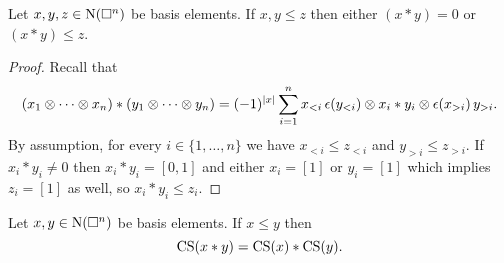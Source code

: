 \begin{lemma}
	Let $x, y, z \in \operatorname{N}(\square^n)$ be basis elements.
	If $x, y \leq z$ then either $(x \ast y) = 0$ or $(x \ast y) \leq z$.
\end{lemma}

\begin{proof}
	Recall that
	\begin{align*}
		(x_1 \otimes \cdots \otimes x_n) \ast (y_1 \otimes \cdots \otimes y_n) =
		(-1)^{|x|} \sum_{i=1}^n x_{<i}\, \epsilon(y_{<i}) \otimes x_i \ast y_i \otimes \epsilon(x_{>i}) \, y_{>i}.
	\end{align*}
	By assumption, for every $i \in \{1, \dots, n\}$ we have $x_{<i} \leq z_{<i}$ and $y_{>i} \leq z_{>i}$.
	If $x_i \ast y_i \neq 0$ then $x_i \ast y_i = [0,1]$ and either $x_i = [1]$ or $y_i = [1]$ which implies $z_i = [1]$ as well, so $x_i \ast y_i \leq z_i$.
\end{proof}

\begin{lemma}
	Let $x, y \in \operatorname{N}(\square^n)$ be basis elements.
	If $x \leq y$ then
	\begin{equation} \label{e:cs collapse as algebra map}
		\operatorname{CS}(x \ast y) = \operatorname{CS}(x) \ast \operatorname{CS}(y).
	\end{equation}
\end{lemma}

